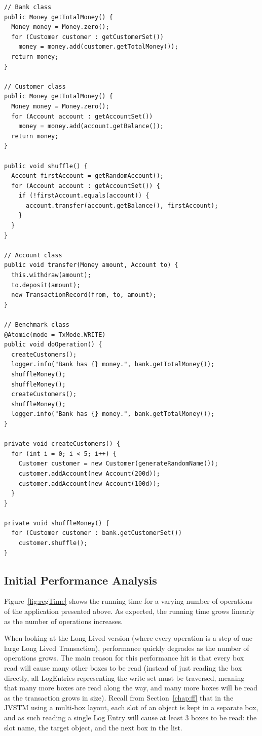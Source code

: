 \documentclass{llncs}
\begin{document}
\begin{lstlisting}[caption={Code for the Business Operation},
label={list:bank-code},float]
// Bank class
public Money getTotalMoney() {
  Money money = Money.zero();
  for (Customer customer : getCustomerSet())
    money = money.add(customer.getTotalMoney());
  return money;
}

// Customer class
public Money getTotalMoney() {
  Money money = Money.zero();
  for (Account account : getAccountSet())
    money = money.add(account.getBalance());
  return money;
}

public void shuffle() {
  Account firstAccount = getRandomAccount();
  for (Account account : getAccountSet()) {
    if (!firstAccount.equals(account)) {
      account.transfer(account.getBalance(), firstAccount);
    }
  }
}

// Account class
public void transfer(Money amount, Account to) {
  this.withdraw(amount);
  to.deposit(amount);
  new TransactionRecord(from, to, amount);
}

// Benchmark class
@Atomic(mode = TxMode.WRITE)
public void doOperation() {
  createCustomers();
  logger.info("Bank has {} money.", bank.getTotalMoney());
  shuffleMoney();
  shuffleMoney();
  createCustomers();
  shuffleMoney();
  logger.info("Bank has {} money.", bank.getTotalMoney());
}

private void createCustomers() {
  for (int i = 0; i < 5; i++) {
    Customer customer = new Customer(generateRandomName());
    customer.addAccount(new Account(200d));
    customer.addAccount(new Account(100d));
  }
}

private void shuffleMoney() {
  for (Customer customer : bank.getCustomerSet())
    customer.shuffle();
}
\end{lstlisting}


\subsection{Initial Performance Analysis}

Figure~\ref{fig:regTime} shows the running time for a varying number
of operations of the application presented above. As expected, the
running time grows linearly as the number of operations increases.

When looking at the Long Lived version (where every operation is a
step of one large Long Lived Transaction), performance quickly
degrades as the number of operations grows. The main reason for this
performance hit is that every box read will cause many other boxes to
be read (instead of just reading the box directly, all LogEntries
representing the write set must be traversed, meaning that many more
boxes are read along the way, and many more boxes will be read as the
transaction grows in size). Recall from Section~\ref{chap:ff} that in
the JVSTM using a multi-box layout, each slot of an object is kept in
a separate box, and as such reading a single Log Entry will cause at
least 3 boxes to be read: the slot name, the target object, and the
next box in the list.
\end{document}
